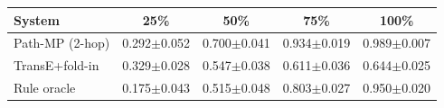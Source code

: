 \begin{tabular}{lcccc}\toprule
System & 25\% & 50\% & 75\% & 100\% \\\midrule
Path-MP (2-hop) & 0.292$\pm$0.052 & 0.700$\pm$0.041 & 0.934$\pm$0.019 & 0.989$\pm$0.007 \\
TransE+fold-in & 0.329$\pm$0.028 & 0.547$\pm$0.038 & 0.611$\pm$0.036 & 0.644$\pm$0.025 \\
Rule oracle & 0.175$\pm$0.043 & 0.515$\pm$0.048 & 0.803$\pm$0.027 & 0.950$\pm$0.020 \\
\bottomrule\end{tabular}
